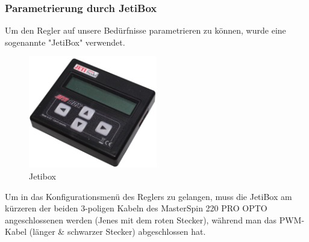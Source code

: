 \subsubsection*{Parametrierung durch JetiBox}
Um den Regler auf unsere Bedürfnisse parametrieren zu können, wurde eine sogenannte "JetiBox" verwendet.
\begin{figure}[h]
    \centering
    \includegraphics[width=0.5\textwidth]{Fotos/JetiBox.png}
    \caption{Jetibox}
\end{figure}
\newpage
Um in das Konfigurationsmenü des Reglers zu gelangen, muss die JetiBox am kürzeren der beiden 3-poligen Kabeln des MasterSpin 220 PRO OPTO angeschlossenen werden (Jenes mit dem roten Stecker), 
während man das PWM-Kabel (länger \& schwarzer Stecker) abgeschlossen hat.\\

